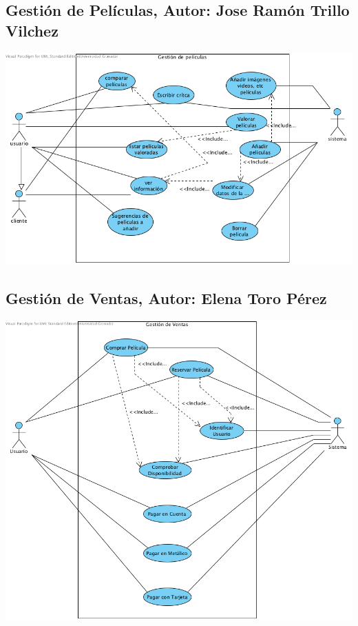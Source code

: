 \documentclass{article}
\begin{document}
\subsection*{Gestión de Películas, Autor: Jose Ramón Trillo Vilchez}
		\begin{center}
   			\includegraphics[scale=0.65]{GestiondePeliculas.png}
   		\end{center}	
   		\pagebreak
\subsection*{Gestión de Ventas, Autor: Elena Toro Pérez}
		\begin{center}
   			\includegraphics[scale=0.65]{GestiondeVentas.png}
   		\end{center}	
   		\pagebreak
\end{document}
